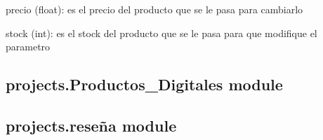 \documentclass[letterpaper,10pt,spanish]{sphinxmanual}
\begin{document}
\begin{fulllineitems}
\begin{fulllineitems}
\begin{description}
\end{description}

\end{fulllineitems}


\begin{fulllineitems}
\label{\detokenize{projects:projects.Productos.Productos.set_precio}}
\pysigstartsignatures
{}
\pysigstopsignatures\begin{description}
\sphinxAtStartPar
precio (float): es el precio del producto que se le pasa para cambiarlo

\end{description}

\end{fulllineitems}


\begin{fulllineitems}
\label{\detokenize{projects:projects.Productos.Productos.set_stock}}
\pysigstartsignatures
{}
\pysigstopsignatures\begin{description}
\sphinxAtStartPar
stock (int): es el stock del producto que se le pasa para que modifique el parametro

\end{description}

\end{fulllineitems}


\end{fulllineitems}



\subsection{projects.Productos\_Digitales module}
\label{\detokenize{projects:projects-productos-digitales-module}}

\subsection{projects.reseña module}
\label{\detokenize{projects:projects-resena-module}}
\end{document}
